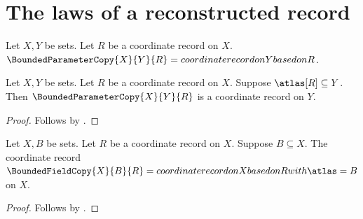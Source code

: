 

\section{The laws of a reconstructed record}

\begin{definition}\label{bounded_parameter_copy}
    Let $X,Y$ be sets.
    Let $R$ be a coordinate record on $X$.
    $\BoundedParameterCopy{X}{Y}{R}=
        coordinate record on Y based on R$.
\end{definition}

\begin{proposition}\label{bounded_parameter_copy_result}
    Let $X,Y$ be sets.
    Let $R$ be a coordinate record on $X$.
    Suppose $\atlas[R]\subseteq Y$.
    Then $\BoundedParameterCopy{X}{Y}{R}$ is a coordinate record on $Y$.
\end{proposition}
\begin{proof}
    Follows by .
\end{proof}

\begin{construction}\label{bounded_field_copy}
    Let $X,B$ be sets.
    Let $R$ be a coordinate record on $X$.
    Suppose $B\subseteq X$.
    The coordinate record $\BoundedFieldCopy{X}{B}{R}=
        coordinate record on X based on R with \atlas=B$ on $X$.
\end{construction}
\begin{proof}
    Follows by .
\end{proof}
